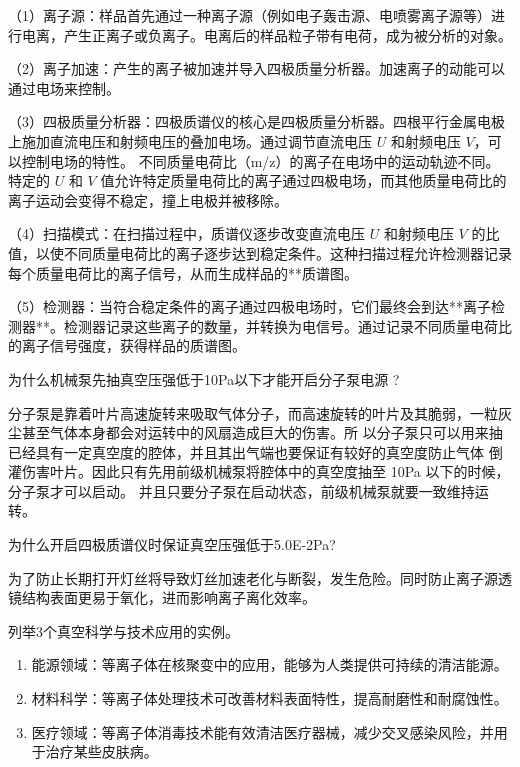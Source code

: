 \documentclass[dvipsnames, svgnames,a4paper,11pt]{article}
\begin{document}
（1）离子源：样品首先通过一种离子源（例如电子轰击源、电喷雾离子源等）进行电离，产生正离子或负离子。电离后的样品粒子带有电荷，成为被分析的对象。

 （2）离子加速：产生的离子被加速并导入四极质量分析器。加速离子的动能可以通过电场来控制。

 （3）四极质量分析器：四极质谱仪的核心是四极质量分析器。四根平行金属电极上施加直流电压和射频电压的叠加电场。通过调节直流电压 \( U \) 和射频电压 \( V \)，可以控制电场的特性。 不同质量电荷比（m/z）的离子在电场中的运动轨迹不同。特定的 \( U \) 和 \( V \) 值允许特定质量电荷比的离子通过四极电场，而其他质量电荷比的离子运动会变得不稳定，撞上电极并被移除。

 （4）扫描模式：在扫描过程中，质谱仪逐步改变直流电压 \( U \) 和射频电压 \( V \) 的比值，以使不同质量电荷比的离子逐步达到稳定条件。这种扫描过程允许检测器记录每个质量电荷比的离子信号，从而生成样品的**质谱图。

 （5）检测器：当符合稳定条件的离子通过四极电场时，它们最终会到达**离子检测器**。检测器记录这些离子的数量，并转换为电信号。通过记录不同质量电荷比的离子信号强度，获得样品的质谱图。



\begin{question}
	为什么机械泵先抽真空压强低于10Pa以下才能开启分子泵电源 ?
\end{question}
分子泵是靠着叶片高速旋转来吸取气体分子，而高速旋转的叶片及其脆弱，一粒灰尘甚至气体本身都会对运转中的风扇造成巨大的伤害。所
以分子泵只可以用来抽已经具有一定真空度的腔体，并且其出气端也要保证有较好的真空度防止气体
倒灌伤害叶片。因此只有先用前级机械泵将腔体中的真空度抽至 10Pa 以下的时候，分子泵才可以启动。
并且只要分子泵在启动状态，前级机械泵就要一致维持运转。


\begin{question}
	为什么开启四极质谱仪时保证真空压强低于5.0E-2Pa?	
\end{question}
为了防止长期打开灯丝将导致灯丝加速老化与断裂，发生危险。同时防止离子源透镜结构表面更易于氧化，进而影响离子离化效率。

\begin{question}
	列举3个真空科学与技术应用的实例。	
\end{question}
\begin{enumerate}
	\item 能源领域：等离子体在核聚变中的应用，能够为人类提供可持续的清洁能源。
	\item 材料科学：等离子体处理技术可改善材料表面特性，提高耐磨性和耐腐蚀性。
	\item 医疗领域：等离子体消毒技术能有效清洁医疗器械，减少交叉感染风险，并用于治疗某些皮肤病。
\end{enumerate}
\end{document}
